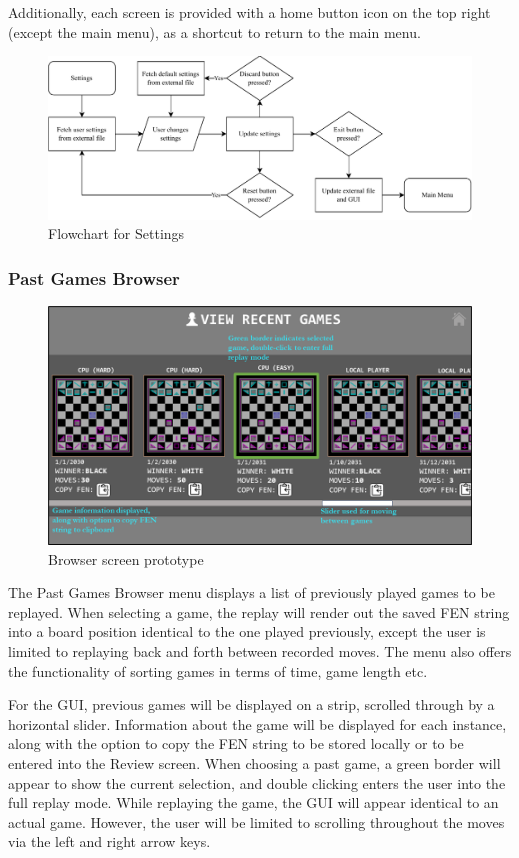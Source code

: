 \documentclass[../main/main.tex]{subfiles}
\begin{document}
Additionally, each screen is provided with a home button icon on the top right (except the main menu), as a shortcut to return to the main menu.

\begin{figure}[ht!]
    \centering
    \includegraphics[width=\columnwidth]{../design/assets/settings_flowchart.pdf}
    \caption{Flowchart for Settings}
    \label{fig:settings-flowchart}
\end{figure}

\subsubsection{Past Games Browser}
\begin{figure}[ht!]
    \centering
    \includegraphics[width=0.8\columnwidth]{../design/assets/browser_gui.png}
    \caption{Browser screen prototype}
    \label{fig:browser-gui}
\end{figure}

The Past Games Browser menu displays a list of previously played games to be replayed. When selecting a game, the replay will render out the saved FEN string into a board position identical to the one played previously, except the user is limited to replaying back and forth between recorded moves. The menu also offers the functionality of sorting games in terms of time, game length etc.

For the GUI, previous games will be displayed on a strip, scrolled through by a horizontal slider. Information about the game will be displayed for each instance, along with the option to copy the FEN string to be stored locally or to be entered into the Review screen. When choosing a past game, a green border will appear to show the current selection, and double clicking enters the user into the full replay mode.
While replaying the game, the GUI will appear identical to an actual game. However, the user will be limited to scrolling throughout the moves via the left and right arrow keys.
\end{document}
